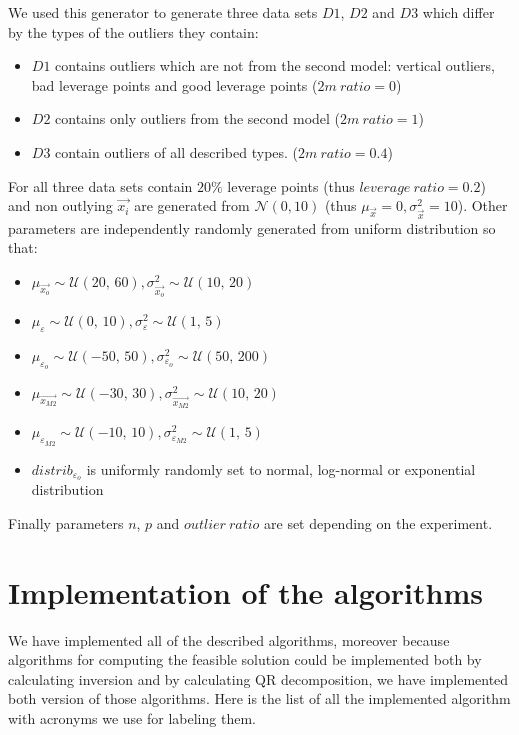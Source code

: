 We used this generator to generate three data sets $D1$, $D2$ and $D3$ which differ by the types of the outliers they contain:
\begin{itemize}
    \item $D1$ contains outliers which are not from the second model: vertical outliers, bad leverage points and good leverage points ($2m~ratio = 0$)
    \item $D2$ contains only outliers from the second model ($2m~ratio = 1$)
    \item $D3$ contain outliers of all described types. ($2m~ratio = 0.4$)
\end{itemize}

For all three data sets contain $20\%$ leverage points (thus $leverage~ratio = 0.2$) and non outlying $\vec{x_i}$ are generated from $\mathcal{N}(0,10)$ (thus $\mu_{\vec{x}} = 0, \sigma^{2}_{\vec{x}} = 10$). Other parameters are independently randomly generated from uniform distribution so that:
\begin{itemize}
    \item $\mu_{\vec{x_o}} \sim \mathcal{U}(20,\,60), \sigma^{2}_{\vec{x_o}} \sim \mathcal{U}(10,\,20)$
    \item $\mu_{\varepsilon} \sim \mathcal{U}(0,\,10), \sigma^{2}_{\varepsilon}  \sim \mathcal{U}(1,\,5)$ 
    \item $\mu_{\varepsilon_o} \sim \mathcal{U}(-50,\,50), \sigma^{2}_{\varepsilon_o} \sim \mathcal{U}(50,\,200)$
    \item $\mu_{\vec{x_{M2}}} \sim \mathcal{U}(-30,\,30), \sigma^{2}_{\vec{x_{M2}}} \sim \mathcal{U}(10,\,20)$
    \item  $\mu_{\varepsilon_{M2}}  \sim \mathcal{U}(-10,\,10) , \sigma^{2}_{\varepsilon_{M2}}\sim \mathcal{U}(1,\,5)$
    \item $distrib_{\varepsilon_o}$ is uniformly randomly set to normal, log-normal  or exponential distribution 
\end{itemize}
Finally parameters $n$, $p$ and $outlier~ratio$  are set depending on the experiment.

\section{Implementation of the algorithms}
We have implemented all of the described algorithms, moreover because algorithms for computing the feasible solution could be implemented both by calculating inversion and by calculating QR decomposition, we have implemented both version of those algorithms. Here is the list of all the implemented algorithm with acronyms we use for labeling them.

